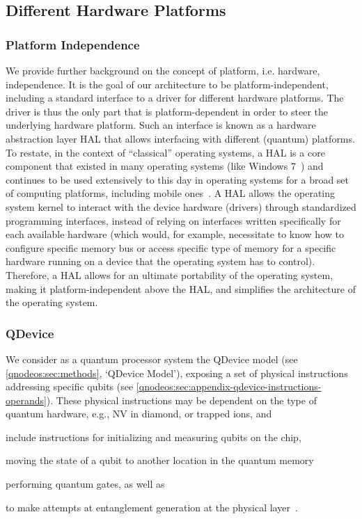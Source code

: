 \subsection{Different Hardware Platforms} 

\subsubsection{Platform Independence}

We provide further background on the concept of platform, i.e. hardware, independence. It is the goal of our architecture to be platform-independent, including a standard interface to a driver for different hardware platforms. The driver is thus the only part that is platform-dependent in order to steer the underlying hardware platform. Such an interface is known as a hardware abstraction layer \ac{HAL} that allows interfacing with different (quantum) platforms. To restate, in the context of ``classical'' operating systems, a \ac{HAL} is a core component that existed in many operating systems (like Windows 7~\cite[Section 19.3.1]{silberschatz_book_2014}) and continues to be used extensively to this day in operating systems for a broad set of computing platforms, including mobile ones~\cite{android_hal}. A \ac{HAL} allows the operating system kernel to interact with the device hardware (drivers) through standardized programming interfaces, instead of relying on interfaces written specifically for each available hardware (which would, for example, necessitate to know how to configure specific memory bus or access specific type of memory for a specific hardware running on a device that the operating system has to control). Therefore, a \ac{HAL} allows for an ultimate portability of the operating system, making it platform-independent above the \ac{HAL}, and simplifies the architecture of the operating system. 

\subsubsection{QDevice}
We consider as a quantum processor system the \ac{QDevice} model (see \cref{qnodeos:sec:methods}, `QDevice Model'), exposing a set of physical instructions addressing specific qubits (see \cref{qnodeos:sec:appendix-qdevice-instructions-operands}). These physical instructions may be dependent on the type of quantum hardware, e.g., \ac{NV} in diamond, or trapped ions, and
%
\begin{inlinelist}
\item include instructions for initializing and measuring qubits on the chip,
\item moving the state of a qubit to another location in the quantum memory
\item performing quantum gates, as well as
\item to make attempts at entanglement generation at the physical layer~\cite{pompili_2022_experimental}.
\end{inlinelist}

